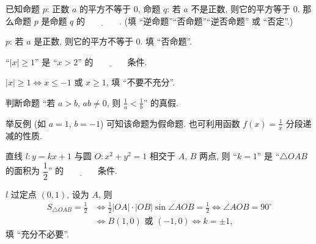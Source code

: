   \begin{exercise}
    已知命题 $p$: 正数 $a$ 的平方不等于 $0$, 
    命题 $q$: 若 $a$ 不是正数, 则它的平方等于 $0$. 
    那么命题 $p$ 是命题 $q$ 的$\underline{\qquad\qquad}$.
    (填 ``逆命题''``否命题''``逆否命题'' 或 ``否定''.)
  \end{exercise}

  \beginsolution
    $p$: 若 $a$ 是正数, 则它的平方不等于 $0$. 填 ``否命题''.
  \endsolution
  
  \begin{exercise}
    ``$|x|\geqslant 1$'' 是 ``$x>2$'' 的$\underline{\qquad\qquad}$条件.
  \end{exercise}

  \beginsolution
    $|x|\geqslant 1\Leftrightarrow x\leqslant -1$ 或 $x\geqslant 1$, 填 ``不要不充分''.
  \endsolution
  
  \begin{exercise}
    判断命题 ``若 $a>b$, $ab\neq 0$, 则 $\frac1a<\frac1b$'' 的真假.
  \end{exercise}
  
  \beginsolution
    举反例 (如 $a=1$, $b=-1$) 可知该命题为假命题. 也可利用函数 $f(x)=\frac1x$ 分段递减的性质.
  \endsolution
  
  
  \begin{exercise}
    直线 $l\colon y=kx+1$ 与圆 $O\colon x^2 +y^2 =1$ 相交于 $A$, $B$ 两点, 
    则 ``$k=1$'' 是 ``$\triangle OAB$ 的面积为 $\dfrac12$'' 
    的$\underline{\qquad\qquad}$条件.
  \end{exercise}

  \beginsolution
    $l$ 过定点 $(0,1)$, 设为 $A$, 
    则 
    \begin{align*}
      S_{\triangle OAB}=\frac12 
      &\Leftrightarrow \frac12 |OA|\cdot|OB|\sin\angle AOB= \frac12 
       \Leftrightarrow \angle AOB= 90^\circ \\
      &\Leftrightarrow B(1,0) \text{\ 或\ } (-1,0) 
       \Leftrightarrow k=\pm1,
    \end{align*}
    填 ``充分不必要''.
  \endsolution
  
